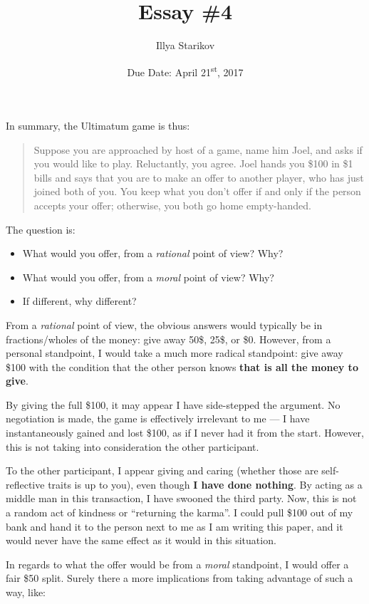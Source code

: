 \documentclass[12pt]{article}
\title{Essay \#4}
\date{Due Date: April 21\textsuperscript{st}, 2017}
\author{Illya Starikov}
\begin{document}
\maketitle

In summary, the Ultimatum game is thus:

\begin{quote}
    Suppose you are approached by host of a game, name him Joel, and asks if you would like to play. Reluctantly, you agree. Joel hands you \$100 in \$1 bills and says that you are to make an offer to another player, who has just joined both of you. You keep what you don't offer if and only if the person accepts your offer; otherwise, you both go home empty-handed.
\end{quote}

The question is:

\begin{itemize}
    \item What would you offer, from a \textit{rational} point of view? Why?
    \item What would you offer, from a \textit{moral} point of view? Why?
    \item If different, why different?
\end{itemize}

From a \textit{rational} point of view, the obvious answers would typically be in fractions/wholes of the money: give away 50\$, 25\$, or \$0. However, from a personal standpoint, I would take a much more radical standpoint: give away \$100 with the condition that the other person knows \textbf{that is all the money to give}.

By giving the full \$100, it may appear I have side-stepped the argument. No negotiation is made, the game is effectively irrelevant to me --- I have instantaneously gained and lost \$100, as if I never had it from the start. However, this is not taking into consideration the other participant.

To the other participant, I appear giving and caring (whether those are self-reflective traits is up to you), even though \textbf{I have done nothing}. By acting as a middle man in this transaction, I have swooned the third party. Now, this is not a random act of kindness or ``returning the karma''. I could pull \$100 out of my bank and hand it to the person next to me as I am writing this paper, and it would never have the same effect as it would in this situation.

In regards to what the offer would be from a \textit{moral} standpoint, I would offer a fair \$50 split. Surely there a more implications from taking advantage of such a way, like:
\end{document}
